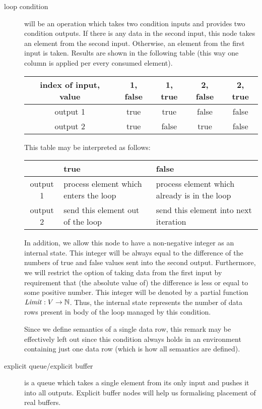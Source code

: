 \begin{description}
  \item [loop condition] will be an operation which takes two condition inputs and provides two condition outputs. If there is any data in the second input, this node takes an element from the second input. Otherwise, an element from the first input is taken. Results are shown in the following table (this way one column is applied per every consumed element).
    \mybeginfig
    \begin{center}
      \begin{tabular}{c|c|c|c|c}
        index of input, value & 1, false & 1, true & 2, false & 2, true \\ \hline
        output 1  & true            & true           & false           & false          \\ \hline
        output 2  & true            & false          & true            & false          \\ 
      \end{tabular}
    \end{center}
    This table may be interpreted as follows:
    \mybeginfig
    \begin{center}
      \begin{tabular}{c|p{4cm}|p{4cm}}
        & true            & false \\ \hline
        output 1  & process element which enters the loop & process element which already is in the loop \\ \hline
        output 2  & send this element out of the loop & send this element into next iteration \\ 
      \end{tabular}
    \end{center}
      In addition, we allow this node to have a non-negative integer as an internal state. This integer will be always equal to the difference of the numbers of true and false values sent into the second output. Furthermore, we will restrict the option of taking data from the first input by requirement that (the absolute value of) the difference is less or equal to some positive number. This integer will be denoted by a partial function $\mf{limit}: V \arrow \N$. Thus, the internal state represents the number of data rows present in body of the loop managed by this condition.
      
      \textnormal{Since we define semantics of a single data row, this remark may be effectively left out since this condition always holds in an environment containing just one data row (which is how all semantics are defined). }

  \item [explicit queue/explicit buffer] is a queue which takes a single element from its only input and pushes it into all outputs. Explicit buffer nodes will help us formalising placement of real buffers. 
\end{description}
\myenddef

